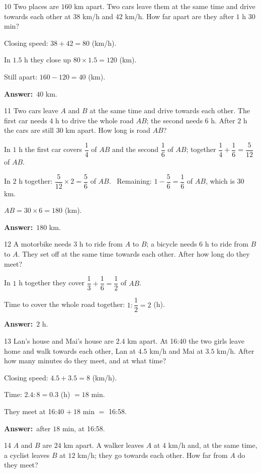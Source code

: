 \documentclass[11pt]{article}
\newif\ifsol \solfalse
\providecommand{\AnsWord}{Đáp số}
\newcommand{\dapso}[1]{\par\textbf{\AnsWord:}\ #1}
\newcommand{\probsol}[1]{%
  \begin{lrbox}{\solmeasure}\begin{minipage}{\dimexpr\linewidth-24pt\relax}#1\end{minipage}\end{lrbox}%
  \ifsol
    \begin{solbox}#1\end{solbox}%
  \else
    \setlength{\solht}{\dimexpr\ht\solmeasure+\dp\solmeasure+0.85cm\relax}%
    \ifdim\solht<1.35cm\setlength{\solht}{1.35cm}\fi
    \begin{tcolorbox}[colback=white,colframe=Line,boxrule=0.8pt,arc=5pt,
      left=8pt,right=8pt,top=4pt,bottom=4pt,height=\solht]{\footnotesize\color{Slate}\itshape\WorkWord}\end{tcolorbox}%
  \fi}
\newcommand{\gap}{\vspace{0.3cm}}
\def\WorkWord{Your work:}
\def\AnsWord{Answer}
\begin{document}
\gap
\begin{probbox}{10}{\relax}
Two places are $160$ km apart. Two cars leave them at the same time and drive towards each other at $38$ km/h and $42$ km/h. How far apart are they after $1$ h $30$ min?
\end{probbox}
\probsol{
Closing speed: $38+42=80$ (km/h).\par In $1.5$ h they close up $80\times1.5=120$ (km).\par Still apart: $160-120=40$ (km).
\dapso{$40$ km.}}
\gap
\begin{probbox}{11}{\relax}
Two cars leave $A$ and $B$ at the same time and drive towards each other. The first car needs $4$ h to drive the whole road $AB$; the second needs $6$ h. After $2$ h the cars are still $30$ km apart. How long is road $AB$?
\end{probbox}
\probsol{
In $1$ h the first car covers $\dfrac14$ of $AB$ and the second $\dfrac16$ of $AB$; together $\dfrac14+\dfrac16=\dfrac5{12}$ of $AB$.\par
In $2$ h together: $\dfrac5{12}\times2=\dfrac56$ of $AB$. \ Remaining: $1-\dfrac56=\dfrac16$ of $AB$, which is $30$ km.\par
$AB=30\times6=180$ (km).
\dapso{$180$ km.}}
\gap
\begin{probbox}{12}{\relax}
A motorbike needs $3$ h to ride from $A$ to $B$; a bicycle needs $6$ h to ride from $B$ to $A$. They set off at the same time towards each other. After how long do they meet?
\end{probbox}
\probsol{
In $1$ h together they cover $\dfrac13+\dfrac16=\dfrac12$ of $AB$.\par Time to cover the whole road together: $1:\dfrac12=2$ (h).
\dapso{$2$ h.}}
\gap
\begin{probbox}{13}{\relax}
Lan's house and Mai's house are $2.4$ km apart. At 16:40 the two girls leave home and walk towards each other, Lan at $4.5$ km/h and Mai at $3.5$ km/h. After how many minutes do they meet, and at what time?
\end{probbox}
\probsol{
Closing speed: $4.5+3.5=8$ (km/h).\par Time: $2.4:8=0.3$ (h) $=18$ min.\par They meet at 16:40 $+\ 18$ min $=$ 16:58.
\dapso{after $18$ min, at 16:58.}}
\gap
\begin{probbox}{14}{\relax}
$A$ and $B$ are $24$ km apart. A walker leaves $A$ at $4$ km/h and, at the same time, a cyclist leaves $B$ at $12$ km/h; they go towards each other. How far from $A$ do they meet?
\end{probbox}
\end{document}

